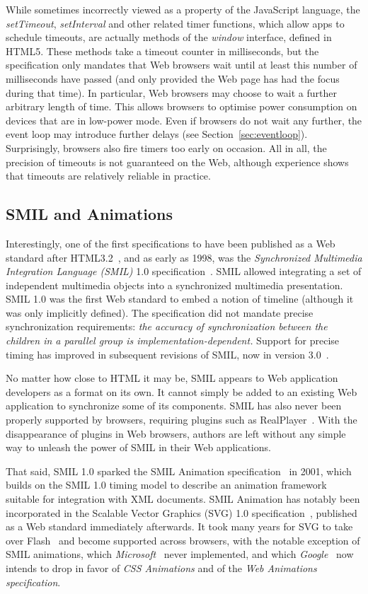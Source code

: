 While sometimes incorrectly viewed as a property of the JavaScript language,
the \emph{setTimeout}, \emph{setInterval} and other related timer functions,
which allow apps to schedule timeouts, are actually methods of the
\emph{window} interface, defined in HTML5. These methods take a timeout
counter in milliseconds, but the specification only mandates that Web browsers
wait until at least this number of milliseconds have passed (and only provided
the Web page has had the focus during that time). In particular, Web browsers
may choose to wait a further arbitrary length of time. This allows browsers to
optimise power consumption on devices that are in low-power mode. Even if
browsers do not wait any further, the event loop may introduce further delays
(see Section~\ref{sec:eventloop}). Surprisingly, browsers also fire timers too
early on occasion. All in all, the precision of timeouts is not guaranteed on
the Web, although experience shows that timeouts are relatively reliable in
practice.

\subsection{SMIL and Animations}
\label{sec:smil}

Interestingly, one of the first specifications to have been published as a Web
standard after HTML3.2~\cite{html32}, and as early as 1998, was the
\emph{Synchronized Multimedia Integration Language (SMIL)} 1.0
specification~\cite{smil1}. SMIL allowed integrating a set of independent
multimedia objects into a synchronized multimedia presentation. SMIL 1.0 was
the first Web standard to embed a notion of timeline (although it was only
implicitly defined). The specification did not mandate precise synchronization
requirements: \emph{the accuracy of synchronization between the children in a
parallel group is implementation-dependent.} Support for precise timing has
improved in subsequent revisions of SMIL, now in version 3.0~\cite{smil3}.

No matter how close to HTML it may be, SMIL appears to Web application
developers as a format on its own. It cannot simply be added to an existing
Web application to synchronize some of its components. SMIL has also never
been properly supported by browsers, requiring plugins such as
RealPlayer~\cite{realplayer}. With the disappearance of plugins in Web
browsers, authors are left without any simple way to unleash the power of SMIL
in their Web applications.

That said, SMIL 1.0 sparked the SMIL Animation
specification~\cite{smilanimation} in 2001, which builds on the SMIL 1.0
timing model to describe an animation framework suitable for integration with
XML documents. SMIL Animation has notably been incorporated in the Scalable
Vector Graphics (SVG) 1.0 specification~\cite{svg}, published as a Web
standard immediately afterwards. It took many years for SVG to take over
Flash~\cite{flash} and become supported across browsers, with the notable
exception of SMIL animations, which \emph{Microsoft}~\cite{microsoft} never
implemented, and which \emph{Google}~\cite{google} now intends to drop in
favor of \emph{CSS Animations} and of the \emph{Web Animations specification}.

